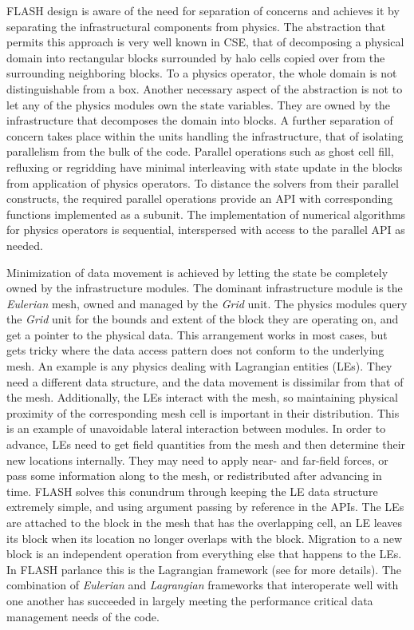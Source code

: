 FLASH design is aware of the need for separation of concerns and
achieves it by separating the infrastructural components
from physics. The abstraction that permits this approach is very
well known in CSE, that of decomposing a physical domain into
rectangular blocks surrounded by halo cells copied over from the
surrounding neighboring blocks. To a physics operator, the whole domain is
not distinguishable from a box. Another necessary aspect of the abstraction 
is not to let any of the physics modules own the state
variables. They are owned by the infrastructure that 
decomposes the domain into blocks. A further separation of concern
takes place within the units handling the infrastructure, that of
isolating parallelism from the bulk of the code. Parallel
operations such as ghost cell fill, refluxing or regridding have
minimal interleaving with state update in the blocks from application
of physics operators. To distance the solvers from their parallel
constructs, the required parallel operations provide an API with
corresponding functions implemented as a subunit. The implementation
of numerical algorithms for physics operators is sequential,
interspersed with access to the parallel API as needed. 

Minimization of data movement is achieved by letting the state be
completely owned by the infrastructure modules. The dominant
infrastructure module is the {\em Eulerian} mesh, owned and managed by
the {\em Grid} unit. The physics modules query the {\em Grid} unit
for the bounds and extent of the block they are operating on, and
get a pointer to the physical data. This arrangement works in most
cases, but gets tricky where  the data access pattern does not conform
to the underlying mesh. An example is any physics dealing with
Lagrangian entities (LEs). They need a different data structure, and
the data movement is dissimilar from that of the mesh. Additionally,
the LEs interact with the mesh, so maintaining physical proximity of
the corresponding mesh cell is important in their distribution. This
is an example of unavoidable lateral interaction between modules. In order
to advance, LEs need to get field quantities from the mesh and
then determine their new locations internally. They may
need to apply near- and far-field forces, or pass some information
along to the mesh, or redistributed after advancing in time. FLASH solves 
this conundrum through keeping the LE data structure extremely simple,
and using argument passing by reference in the APIs. The LEs are
attached to the block in the mesh that has the overlapping cell, an LE
leaves its block when its location no longer overlaps with the
block. Migration to a new block is an independent operation from
everything else that happens to the LEs. In FLASH parlance this is
the Lagrangian framework (see \cite{Dubey2012} for more details). The
combination of {\em Eulerian} and {\em Lagrangian} frameworks that
interoperate well with one another has succeeded in largely meeting the
performance critical data management needs of the code. 

